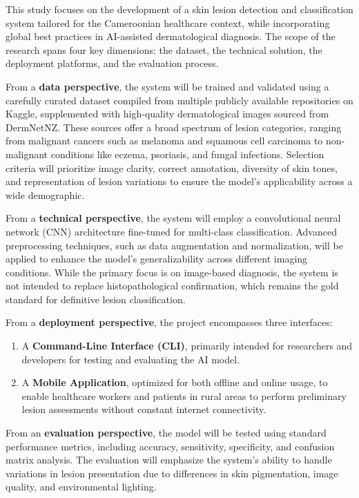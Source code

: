 \documentclass[
  12pt,
  oneside]{article}
\providecommand{\tightlist}{%
  \setlength{\itemsep}{0pt}\setlength{\parskip}{0pt}}
\begin{document}
This study focuses on the development of a skin lesion detection and
classification system tailored for the Cameroonian healthcare context,
while incorporating global best practices in AI-assisted dermatological
diagnosis. The scope of the research spans four key dimensions: the
dataset, the technical solution, the deployment platforms, and the
evaluation process.

From a \textbf{data perspective}, the system will be trained and
validated using a carefully curated dataset compiled from multiple
publicly available repositories on Kaggle, supplemented with
high-quality dermatological images sourced from DermNetNZ. These sources
offer a broad spectrum of lesion categories, ranging from malignant
cancers such as melanoma and squamous cell carcinoma to non-malignant
conditions like eczema, psoriasis, and fungal infections. Selection
criteria will prioritize image clarity, correct annotation, diversity of
skin tones, and representation of lesion variations to ensure the
model's applicability across a wide demographic.

From a \textbf{technical perspective}, the system will employ a
convolutional neural network (CNN) architecture fine-tuned for
multi-class classification. Advanced preprocessing techniques, such as
data augmentation and normalization, will be applied to enhance the
model's generalizability across different imaging conditions. While the
primary focus is on image-based diagnosis, the system is not intended to
replace histopathological confirmation, which remains the gold standard
for definitive lesion classification.

From a \textbf{deployment perspective}, the project encompasses three
interfaces:

\begin{enumerate}
\def\labelenumi{\arabic{enumi}.}
\tightlist
\item
  A \textbf{Command-Line Interface (CLI)}, primarily intended for
  researchers and developers for testing and evaluating the AI model.\\
\item
  A \textbf{Mobile Application}, optimized for both offline and online
  usage, to enable healthcare workers and patients in rural areas to
  perform preliminary lesion assessments without constant internet
  connectivity.
\end{enumerate}

From an \textbf{evaluation perspective}, the model will be tested using
standard performance metrics, including accuracy, sensitivity,
specificity, and confusion matrix analysis. The evaluation will
emphasize the system's ability to handle variations in lesion
presentation due to differences in skin pigmentation, image quality, and
environmental lighting.
\end{document}
